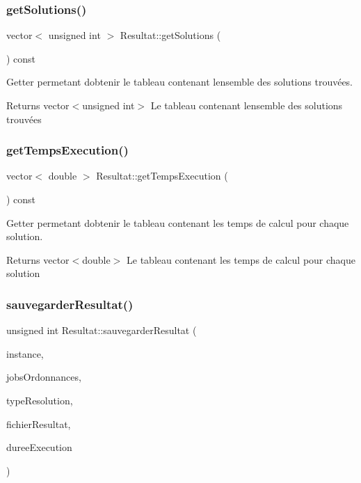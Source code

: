 \subsubsection{\texorpdfstring{get\+Solutions()}{getSolutions()}}
{\footnotesize\ttfamily vector$<$ unsigned int $>$ Resultat\+::get\+Solutions (\begin{DoxyParamCaption}{ }\end{DoxyParamCaption}) const}



Getter permetant d\textquotesingle{}obtenir le tableau contenant l\textquotesingle{}ensemble des solutions trouvées. 

\begin{DoxyReturn}{Returns}
vector$<$unsigned int$>$ Le tableau contenant l\textquotesingle{}ensemble des solutions trouvées 
\end{DoxyReturn}
\mbox{\label{classResultat_aa55a388229eaf8707db45db93303438d}} 
\subsubsection{\texorpdfstring{get\+Temps\+Execution()}{getTempsExecution()}}
{\footnotesize\ttfamily vector$<$ double $>$ Resultat\+::get\+Temps\+Execution (\begin{DoxyParamCaption}{ }\end{DoxyParamCaption}) const}



Getter permetant d\textquotesingle{}obtenir le tableau contenant les temps de calcul pour chaque solution. 

\begin{DoxyReturn}{Returns}
vector$<$double$>$ Le tableau contenant les temps de calcul pour chaque solution 
\end{DoxyReturn}
\mbox{\label{classResultat_adc6f1595c1e2271cd39805a6b62e8448}} 
\subsubsection{\texorpdfstring{sauvegarder\+Resultat()}{sauvegarderResultat()}}
{\footnotesize\ttfamily unsigned int Resultat\+::sauvegarder\+Resultat (\begin{DoxyParamCaption}\item[{\hyperlink{classInstance}{Instance}}]{instance,  }\item[{vector$<$ vector$<$ unsigned int $>$$>$}]{jobs\+Ordonnances,  }\item[{Q\+String}]{type\+Resolution,  }\item[{Q\+String}]{fichier\+Resultat,  }\item[{double}]{duree\+Execution }\end{DoxyParamCaption})}



